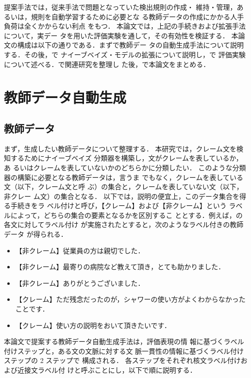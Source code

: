 \documentclass[japanese]{jnlp_1.4}
\def\sec#1{}
\def\fig#1{}
\begin{document}
提案手法では，従来手法で問題となっていた検出規則の作成・
維持・管理，あるいは，規則を自動学習するために必要とな
る教師データの作成にかかる人手負荷は全くかからない利点
をもつ．
本論文では，上記の手続きおよび拡張手法について，実デー
タを用いた評価実験を通して，その有効性を検証する．
本論文の構成は以下の通りである．まず\sec{gen}で教師デー
タの自動生成手法について説明する．その後，\sec{model}で
ナイーブベイズ・モデルの拡張について説明し，\sec{exp}で
評価実験について述べる．\sec{related}で関連研究を整理し
た後，\sec{owarini}で本論文をまとめる．


\section{教師データ自動生成}
\label{sec:gen}

\subsection{教師データ}

まず，生成したい教師データについて整理する．
本研究では，クレーム文を検知するためにナイーブベイズ
分類器\cite{nv}を構築し，文がクレームを表しているか，あ
るいはクレームを表していないかのどちらかに分類したい．
このような分類器の構築に必要となる教師データは，言うま
でもなく，クレームを表している文（以下，クレーム文と呼
  ぶ）の集合と，クレームを表していない文（以下，非クレー
  ム文）の集合となる．
以下では，説明の便宜上，このデータ集合を得る手続きをラ
ベル付けと呼び，【クレーム】および【非クレーム】という
ラベルによって，どちらの集合の要素となるかを区別するこ
ととする．例えば，\fig{review}の各文に対してラベル付け
が実施されたとすると，次のようなラベル付きの教師データ
が得られる．

\begin{itemize}
 \item 【非クレーム】従業員の方は親切でした．
 \item 【非クレーム】最寄りの病院など教えて頂き，とても助かりました．
 \item 【非クレーム】ありがとうございました．
 \item 【クレーム】ただ残念だったのが，シャワーの使い方がよくわからなかったことです．
 \item 【クレーム】使い方の説明をおいて頂きたいです．
\end{itemize}


本論文で提案する教師データ自動生成手法は，評価表現の情
報に基づくラベル付けステップと，ある文の文脈に対する文
脈一貫性の情報に基づくラベル付けステップの 2 ステップで
構成される．
各ステップをそれぞれ核文ラベル付けおよび近接文ラベル付
けと呼ぶことにし，以下で順に説明する．
\end{document}
